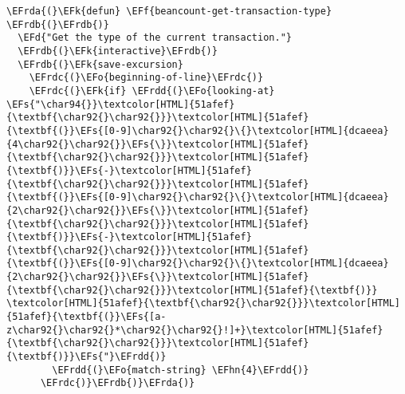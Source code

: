 \documentclass[a4wide,10pt]{article}
\newcommand{\EFs}[1]{\textcolor{EFs}{#1}} %
\newcommand{\EFd}[1]{\textcolor{EFd}{#1}} %
\newcommand{\EFk}[1]{\textcolor{EFk}{#1}} %
\newcommand{\EFf}[1]{\textcolor{EFf}{#1}} %
\newcommand{\EFo}[1]{\textcolor{EFo}{#1}} %
\newcommand{\EFhn}[1]{\textcolor{EFhn}{\textbf{#1}}} %
\newcommand{\EFrda}[1]{\textcolor{EFrda}{#1}} %
\newcommand{\EFrdb}[1]{\textcolor{EFrdb}{#1}} %
\newcommand{\EFrdc}[1]{\textcolor{EFrdc}{#1}} %
\newcommand{\EFrdd}[1]{\textcolor{EFrdd}{#1}} %
\begin{document}
\begin{Code}
\begin{Verbatim}
\EFrda{(}\EFk{defun} \EFf{beancount-get-transaction-type} \EFrdb{(}\EFrdb{)}
  \EFd{"Get the type of the current transaction."}
  \EFrdb{(}\EFk{interactive}\EFrdb{)}
  \EFrdb{(}\EFk{save-excursion}
    \EFrdc{(}\EFo{beginning-of-line}\EFrdc{)}
    \EFrdc{(}\EFk{if} \EFrdd{(}\EFo{looking-at} \EFs{"\char94{}}\textcolor[HTML]{51afef}{\textbf{\char92{}\char92{}}}\textcolor[HTML]{51afef}{\textbf{(}}\EFs{[0-9]\char92{}\char92{}\{}\textcolor[HTML]{dcaeea}{4\char92{}\char92{}}\EFs{\}}\textcolor[HTML]{51afef}{\textbf{\char92{}\char92{}}}\textcolor[HTML]{51afef}{\textbf{)}}\EFs{-}\textcolor[HTML]{51afef}{\textbf{\char92{}\char92{}}}\textcolor[HTML]{51afef}{\textbf{(}}\EFs{[0-9]\char92{}\char92{}\{}\textcolor[HTML]{dcaeea}{2\char92{}\char92{}}\EFs{\}}\textcolor[HTML]{51afef}{\textbf{\char92{}\char92{}}}\textcolor[HTML]{51afef}{\textbf{)}}\EFs{-}\textcolor[HTML]{51afef}{\textbf{\char92{}\char92{}}}\textcolor[HTML]{51afef}{\textbf{(}}\EFs{[0-9]\char92{}\char92{}\{}\textcolor[HTML]{dcaeea}{2\char92{}\char92{}}\EFs{\}}\textcolor[HTML]{51afef}{\textbf{\char92{}\char92{}}}\textcolor[HTML]{51afef}{\textbf{)}} \textcolor[HTML]{51afef}{\textbf{\char92{}\char92{}}}\textcolor[HTML]{51afef}{\textbf{(}}\EFs{[a-z\char92{}\char92{}*\char92{}\char92{}!]+}\textcolor[HTML]{51afef}{\textbf{\char92{}\char92{}}}\textcolor[HTML]{51afef}{\textbf{)}}\EFs{"}\EFrdd{)}
        \EFrdd{(}\EFo{match-string} \EFhn{4}\EFrdd{)}
      \EFrdc{)}\EFrdb{)}\EFrda{)}


\end{Verbatim}
\end{Code}
\end{document}
